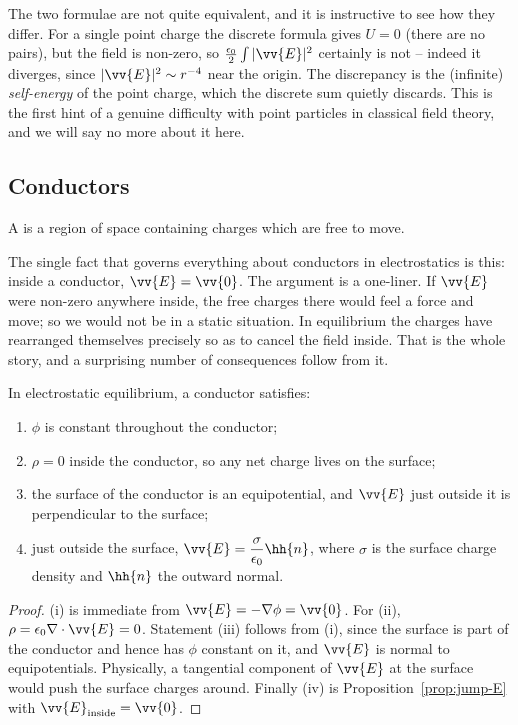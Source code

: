 \begin{remark}
	The two formulae are not quite equivalent, and it is instructive to see how they differ. For a single point charge the discrete formula gives $U = 0$ (there are no pairs), but the field is non-zero, so $\frac{\epsilon_0}{2}\int|\vv{E}|^2$ certainly is not -- indeed it diverges, since $|\vv{E}|^2 \sim r^{-4}$ near the origin. The discrepancy is the (infinite) \emph{self-energy} of the point charge, which the discrete sum quietly discards. This is the first hint of a genuine difficulty with point particles in classical field theory, and we will say no more about it here.
\end{remark}

\subsection{Conductors}

\begin{definition}[Conductor]
	A  is a region of space containing charges which are free to move.
\end{definition}

The single fact that governs everything about conductors in electrostatics is this: inside a conductor, $\vv{E} = \vv{0}$. The argument is a one-liner. If $\vv{E}$ were non-zero anywhere inside, the free charges there would feel a force and move; so we would not be in a static situation. In equilibrium the charges have rearranged themselves precisely so as to cancel the field inside. That is the whole story, and a surprising number of consequences follow from it.

\begin{proposition}
	In electrostatic equilibrium, a conductor satisfies:
	\begin{enumerate}[label=(\roman*)]
		\item $\phi$ is constant throughout the conductor;
		\item $\rho = 0$ inside the conductor, so any net charge lives on the surface;
		\item the surface of the conductor is an equipotential, and $\vv{E}$ just outside it is perpendicular to the surface;
		\item just outside the surface, $\vv{E} = \dfrac{\sigma}{\epsilon_0}\hh{n}$, where $\sigma$ is the surface charge density and $\hh{n}$ the outward normal.
	\end{enumerate}
\end{proposition}
\begin{proof}
	(i) is immediate from $\vv{E} = -\nabla\phi = \vv{0}$. For (ii), $\rho = \epsilon_0 \nabla\cdot \vv{E} = 0$. Statement (iii) follows from (i), since the surface is part of the conductor and hence has $\phi$ constant on it, and $\vv{E}$ is normal to equipotentials. Physically, a tangential component of $\vv{E}$ at the surface would push the surface charges around. Finally (iv) is Proposition~\ref{prop:jump-E} with $\vv{E}_{\text{inside}} = \vv{0}$.
\end{proof}

